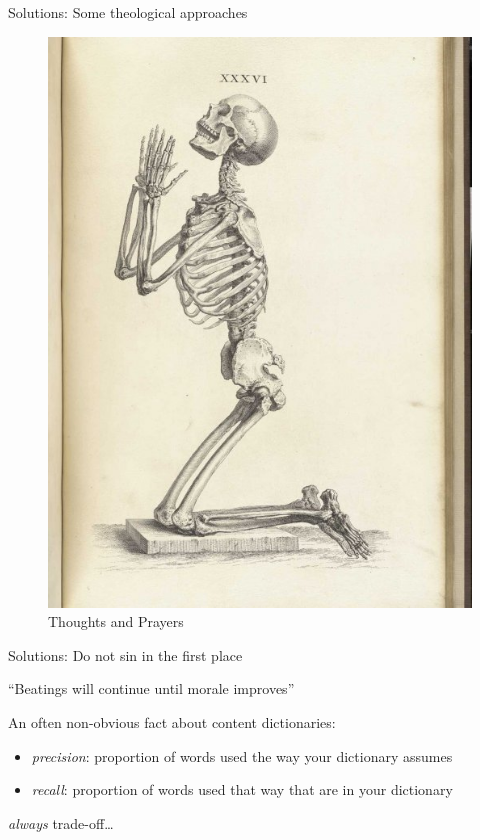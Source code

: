 \documentclass{hertieteaching}
\begin{document}
\begin{frame}{Solutions: Some theological approaches}
\protect\hypertarget{solutions-some-theological-approaches}{}

\pause

\begin{figure}

{\centering \includegraphics[width=7.29in,height=0.8\textheight]{pictures/praying-skeleton} 

}

\caption{Thoughts and Prayers}\label{fig:unnamed-chunk-18}
\end{figure}

\end{frame}

\begin{frame}{Solutions: Do not sin in the first place}
\protect\hypertarget{solutions-do-not-sin-in-the-first-place}{}

``Beatings will continue until morale improves''

\pause

An often non-obvious fact about content dictionaries:

\begin{itemize}
\item
  \emph{precision}: proportion of words used the way your dictionary
  assumes\item
  \emph{recall}: proportion of words used that way that are in your
  dictionary
\end{itemize}

\emph{always} trade-off\ldots{}

\end{frame}
\end{document}
